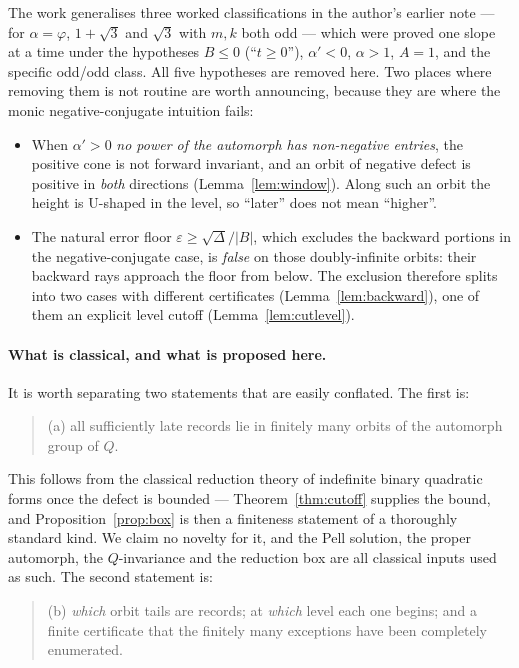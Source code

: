 \documentclass[11pt]{article}
\theoremstyle{definition}
\theoremstyle{remark}
\begin{document}
The work generalises three worked classifications in the author's earlier note
\cite{DeJesus2026oddodd} --- for $\alpha=\varphi$, $1+\sqrt3$ and $\sqrt3$ with $m,k$ both odd
--- which were proved one slope at a time under the hypotheses $B\le0$ (``$t\ge0$''),
$\alpha'<0$, $\alpha>1$, $A=1$, and the specific odd/odd class. All five hypotheses are removed
here. Two places where removing them is not routine are worth announcing, because they are
where the monic negative-conjugate intuition fails:

\begin{itemize}\itemsep2pt
\item When $\alpha'>0$ \emph{no power of the automorph has non-negative entries}, the positive
cone is not forward invariant, and an orbit of negative defect is positive in \emph{both}
directions (Lemma~\ref{lem:window}). Along such an orbit the height is U-shaped in the level,
so ``later'' does not mean ``higher''.
\item The natural error floor $\varepsilon\ge\sqrt\Delta/|B|$, which excludes the backward
portions in the negative-conjugate case, is \emph{false} on those doubly-infinite orbits: their
backward rays approach the floor from below. The exclusion therefore splits into two cases with
different certificates (Lemma~\ref{lem:backward}), one of them an explicit level cutoff
(Lemma~\ref{lem:cutlevel}).
\end{itemize}

\paragraph{What is classical, and what is proposed here.}
It is worth separating two statements that are easily conflated. The first is:

\begin{quote}
(a) all sufficiently late records lie in finitely many orbits of the automorph group of $Q$.
\end{quote}

This follows from the classical reduction theory of indefinite binary quadratic forms
\cite{BuellBQF,Cohen1993,ConradGenPell} once the defect is bounded --- Theorem~\ref{thm:cutoff}
supplies the bound, and Proposition~\ref{prop:box} is then a finiteness statement of a thoroughly
standard kind. We claim no novelty for it, and the Pell solution, the proper automorph, the
$Q$-invariance and the reduction box are all classical inputs used as such. The second
statement is:

\begin{quote}
(b) \emph{which} orbit tails are records; at \emph{which} level each one begins; and a finite
certificate that the finitely many exceptions have been completely enumerated.
\end{quote}
\end{document}
